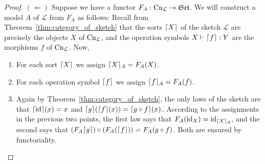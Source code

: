 \documentclass[12pt,twoside]{reedthesis}
\theoremstyle{definition}
\theoremstyle{remark}
\theoremstyle{plain}
\DeclarePairedDelimiter\ceil{\lceil}{\rceil}
\begin{document}
\begin{proof}
  \( (\Leftarrow) \) Suppose we have a functor
  $F_A : \mathrm{Cn}_{\mathcal{L}} \rightarrow \mathfrak{Set}$. We will construct a model $A$ of
  $\mathcal{L}$ from $F_{A}$ as follows: Recall from
  Theorem~\ref{thm:category_of_sketch} %
  that the sorts \(\ceil{X} \) of the sketch $\mathcal{L}$ are precisely the
  objects $X$ of \( \mathrm{Cn}_{ \mathcal{L}} \), and the operation symbols
  \( X \vdash \ceil{ f } : Y \) are the morphisms \( f \) of \( \mathrm{Cn}_{\mathcal{L}}\). Now,
  \begin{enumerate}
    \item For each sort \(\ceil{X}\) we assign \( \ceil{X}_A = F_{A}(X)\).
    \item For each operation symbol \( \ceil{f} \) we assign \( \ceil{f}_{A} = F_{A}(f) \).
    \item Again by Theorem~\ref{thm:category_of_sketch}, the only laws of the
          sketch are that \(\ceil{\text{id}}(x) = x\) and
          \(\ceil{g}(\ceil{f}(x)) = \ceil{g \circ f}(x)\). According to the
          assignments in the previous two points, the first law says that
          \(F_{A}(\text{id}_{X}) = \text{id}_{\ceil{X}_{A}}\), and the second says that
          \( (F_{A} \ceil{g}) \circ (F_{A}(\ceil{f})) = F_{A} (g \circ f)\). Both are
          ensured by functoriality.
  \end{enumerate}
\end{proof}

\end{document}
